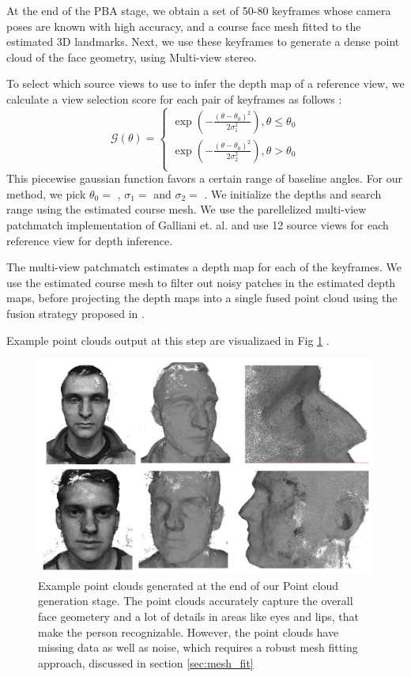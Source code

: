 \documentclass[10pt,twocolumn,letterpaper]{article}
\begin{document}
At the end of the PBA stage, we obtain a set of 50-80 keyframes whose camera poses are known with high accuracy, and a course face mesh fitted to the estimated 3D landmarks. Next, we use these keyframes to generate a dense point cloud of the face geometry, using Multi-view stereo.

To select which source views to use to infer the depth map of a reference view, we calculate a view selection score for each pair of keyframes as follows : 
\[ \mathcal{G}(\theta) =  \left\{
\begin{array}{ll}
      \exp(-\frac{(\theta - \theta_0)^2}{2\sigma_1^2}), \theta \leq \theta_0 \\
      \exp(-\frac{(\theta - \theta_0)^2}{2\sigma_2^2}), \theta > \theta_0 \\
\end{array} 
\right. \]
This piecewise gaussian function favors a certain range of baseline angles. For our method, we pick $\theta_{0} = $  , $\sigma_{1} =$  and $\sigma_2=$  .
We initialize the depths and search range using the estimated course mesh. We use the parellelized multi-view patchmatch implementation of Galliani et. al. \cite{galliani2015massively} and use 12 source views for each reference view for depth inference.

The multi-view patchmatch estimates a depth map for each of the keyframes. We use the estimated course mesh to filter out noisy patches in the estimated depth maps, before projecting the depth maps into a single fused point cloud using the fusion strategy proposed in \cite{galliani2015massively}.

Example point clouds output at this step are visualizaed in Fig \ref{fig:pcl_sample} . 


\begin{figure}[t]
\begin{center}
   \includegraphics[width=0.95\linewidth]{images/point_clouds_sample.png}
\end{center}
   \caption{Example point clouds generated at the end of our Point cloud generation stage. The point clouds accurately capture the overall face geometery and a lot of details in areas like eyes and lips, that make the person recognizable. However, the point clouds have missing data as well as noise, which requires a robust mesh fitting approach, discussed in section \ref{sec:mesh_fit}  }
\label{fig:pcl_sample}
\end{figure}
\end{document}
